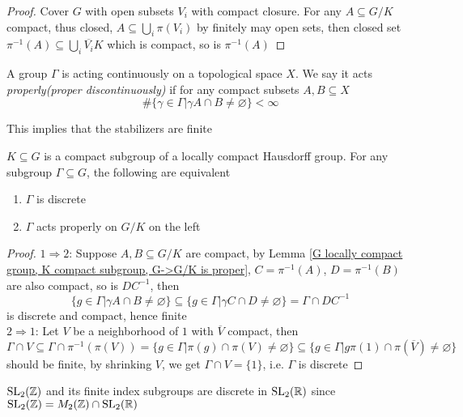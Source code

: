 \documentclass[main]{subfiles}
\begin{document}
\begin{proof}
Cover $G$ with open subsets $V_i$ with compact closure. For any $A\subseteq G/K$ compact, thus closed, $A\subseteq\bigcup_i\pi(V_i)$ by finitely may open sets, then closed set $\pi^{-1}(A)\subseteq\bigcup_i\overline{V_i}K$ which is compact, so is $\pi^{-1}(A)$
\end{proof}

\begin{definition}
A group $\Gamma$ is acting continuously on a topological space $X$. We say it acts \textit{properly(proper discontinuously)} if for any compact subsets $A,B\subseteq X$
\[\#\{\gamma\in\Gamma|\gamma A\cap B\neq\varnothing\}<\infty\]
\end{definition}

\begin{note}
This implies that the stabilizers are finite
\end{note}

\begin{proposition}
$K\subseteq G$ is a compact subgroup of a locally compact Hausdorff group. For any subgroup $\Gamma\subseteq G$, the following are equivalent
\begin{enumerate}
\item $\Gamma$ is discrete
\item $\Gamma$ acts properly on $G/K$ on the left
\end{enumerate}
\end{proposition}

\begin{proof}
$1\Rightarrow2$: Suppose $A,B\subseteq G/K$ are compact, by Lemma \ref{G locally compact group, K compact subgroup, G->G/K is proper}, $C=\pi^{-1}(A)$, $D=\pi^{-1}(B)$ are also compact, so is $DC^{-1}$, then
\[\{g\in\Gamma|\gamma A\cap B\neq\varnothing\}\subseteq\{g\in\Gamma|\gamma C\cap D\neq\varnothing\}=\Gamma\cap DC^{-1}\]
is discrete and compact, hence finite \\
$2\Rightarrow1$: Let $V$ be a neighborhood of $1$ with $\overline V$ compact, then
\[\Gamma\cap V\subseteq \Gamma\cap\pi^{-1}(\pi(V))=\{g\in\Gamma|\pi(g)\cap \pi(V)\neq\varnothing\}\subseteq\{g\in\Gamma|g\pi(1)\cap \pi(\overline V)\neq\varnothing\}\]
should be finite, by shrinking $V$, we get $\Gamma\cap V=\{1\}$, i.e. $\Gamma$ is discrete
\end{proof}

\begin{example}
$\operatorname{SL}_2(\mathbb Z)$ and its finite index subgroups are discrete in $\operatorname{SL}_2(\mathbb R)$ since $\operatorname{SL}_2(\mathbb Z)=M_2(\mathbb Z)\cap\operatorname{SL}_2(\mathbb R)$
\end{example}
\end{document}

